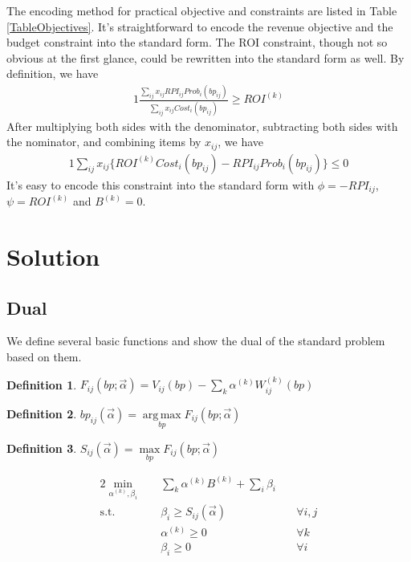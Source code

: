 \documentclass{article}
\DeclareMathOperator*{\argmax}{arg\,max}
\newtheorem{definition}{Definition}[section]
\newcommand{\sumi}{\sum\limits_i}
\newcommand{\sumk}{\sum\limits_k}
\newcommand{\sumij}{\sum\limits_{ij}}
\newcommand{\sx}{x_{ij}}
\newcommand{\sbp}{bp_{ij}}
\newcommand{\sumijx}[1]{\sumij\sx{}#1}
\newcommand{\sProb}{Prob_i(\sbp)}
\newcommand{\sCost}{Cost_i(\sbp)}
\newcommand{\sV}{V_{ij}}
\newcommand{\sW}{W_{ij}^{(k)}}
\newcommand{\sB}{B^{(k)}}
\newcommand{\sROI}{ROI^{(k)}}
\newcommand{\sCPI}{RPI_{ij}}
\newcommand{\sRevenuePforP}{\sumijx{\sCPI\sProb}}
\newcommand{\sBiddingCost}{\sumijx{\sCost}}
\newcommand{\salpha}{\alpha^{(k)}}
\newcommand{\sbeta}{\beta_i}
\newcommand{\sF}{F_{ij}}
\newcommand{\sS}{S_{ij}}
\newcommand{\valpha}{\vec{\alpha}}
\newcommand{\pprob}{\phi}
\newcommand{\pcost}{\psi}
\newcommand{\scoreconstraint}{\sbeta \ge \sS(\vec{\alpha})}
\begin{document}
The encoding method for practical objective and constraints are listed in Table \ref{TableObjectives}.
It's straightforward to encode the revenue objective and the budget constraint into the standard form.
The ROI constraint, though not so obvious at the first glance, could be rewritten into the standard form as well.
By definition, we have
\begin{alignat}{1}
\frac{\sRevenuePforP}{\sBiddingCost}\ge\sROI
\end{alignat}
After multiplying both sides with the denominator,
    subtracting both sides with the nominator,
    and combining items by $\sx$, we have
\begin{alignat}{1}
\sumijx{\{\sROI\sCost-\sCPI\sProb\}}\le0
\end{alignat}
It's easy to encode this constraint into the standard form with $\pprob=-\sCPI$, $\pcost=\sROI$ and $\sB=0$.

\section{Solution} \label{Solution}

\subsection{Dual}

We define several basic functions and show the dual of the standard problem based on them.

\begin{definition}
$\sF(bp; \valpha) = \sV(bp) - \sumk \salpha \sW(bp)$
\end{definition}

\begin{definition}
$\sbp(\valpha) = \argmax\limits_{bp} \sF(bp; \valpha)$
\end{definition}

\begin{definition}
$\sS(\valpha) = \max\limits_{bp} \sF(bp; \valpha)$
\end{definition}

\begin{alignat}{2}
    \min\limits_{\salpha, \sbeta} \quad & \sumk \salpha \sB + \sumi \sbeta \quad & {} \\
    \mbox{s.t.} \quad                   & \scoreconstraint \quad                 & \forall i,j \\
    \quad                               & \salpha \ge 0 \quad                    & \forall k \\
    \quad                               & \sbeta \ge 0 \quad                     & \forall i
\end{alignat}
\end{document}
